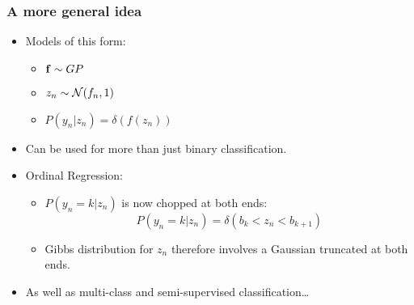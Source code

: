 
\begin{frame}
	\frametitle{A more general idea}
	\begin{itemize}
		\item Models of this form:
		\begin{itemize}
			\item $\mathbf{f} \sim GP$
			\item $z_n\sim {\cal N}(f_n,1)$
			\item $P(y_n|z_n) = \delta(f(z_n))$
		\end{itemize}
		\item Can be used for more than just binary classification.
		\item<2-> Ordinal Regression:
			\begin{itemize}
				\item $P(y_n=k|z_n)$ is now chopped at both ends:
				\[
					P(y_n=k|z_n) = \delta(b_k<z_n<b_{k+1})
				\]
				\item Gibbs distribution for $z_n$ therefore involves a Gaussian truncated at both ends.
			\end{itemize}
		\item<3->As well as multi-class and semi-supervised classification\ldots
	\end{itemize}
\end{frame}


